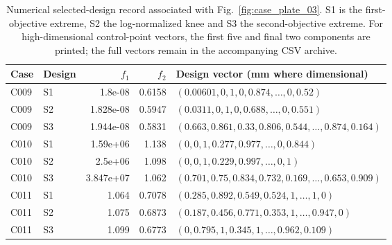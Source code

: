 \begin{table}[p]
\centering\scriptsize
\caption{Numerical selected-design record associated with Fig.~\ref{fig:case_plate_03}. S1 is the first-objective extreme, S2 the log-normalized knee and S3 the second-objective extreme. For high-dimensional control-point vectors, the first five and final two components are printed; the full vectors remain in the accompanying CSV archive.}
\label{tab:case_plate_03}
\setlength{\tabcolsep}{3.2pt}
\begin{tabularx}{\textwidth}{llrr>{\raggedright\arraybackslash}X}
\toprule Case & Design & $f_1$ & $f_2$ & Design vector (mm where dimensional) \\
\midrule
C009 & S1 & 1.8e-08 & 0.6158 & $(0.00601, 0, 1, 0, 0.874, \ldots, 0, 0.52)$ \\
C009 & S2 & 1.828e-08 & 0.5947 & $(0.0311, 0, 1, 0, 0.688, \ldots, 0, 0.551)$ \\
C009 & S3 & 1.944e-08 & 0.5831 & $(0.663, 0.861, 0.33, 0.806, 0.544, \ldots, 0.874, 0.164)$ \\
C010 & S1 & 1.59e+06 & 1.138 & $(0, 0, 1, 0.277, 0.977, \ldots, 0, 0.844)$ \\
C010 & S2 & 2.5e+06 & 1.098 & $(0, 0, 1, 0.229, 0.997, \ldots, 0, 1)$ \\
C010 & S3 & 3.847e+07 & 1.062 & $(0.701, 0.75, 0.834, 0.732, 0.169, \ldots, 0.653, 0.909)$ \\
C011 & S1 & 1.064 & 0.7078 & $(0.285, 0.892, 0.549, 0.524, 1, \ldots, 1, 0)$ \\
C011 & S2 & 1.075 & 0.6873 & $(0.187, 0.456, 0.771, 0.353, 1, \ldots, 0.947, 0)$ \\
C011 & S3 & 1.099 & 0.6773 & $(0, 0.795, 1, 0.345, 1, \ldots, 0.962, 0.109)$ \\
\bottomrule
\end{tabularx}
\end{table}
